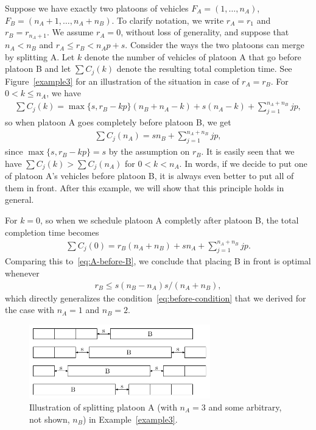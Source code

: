 \documentclass{article}
\theoremstyle{definition}
\theoremstyle{plain}
\begin{document}
\begin{eg}
  \label{example3}
  Suppose we have exactly two platoons of vehicles $F_{A} = (1, \dots, n_{A})$,
  $F_{B} = (n_{A} + 1, \dots, n_{A} + n_{B})$. To clarify notation, we write
  $r_{A} = r_{1}$ and $r_{B} = r_{n_{A} + 1}$. We assume $r_{A} = 0$, without
  loss of generality, and suppose that $n_{A} < n_{B}$ and
  $r_{A} \leq r_{B} < n_{A}p + s$. Consider the ways the two platoons can merge
  by splitting A. Let $k$ denote the number of vehicles of platoon A that go
  before platoon B and let $\sum C_{j}(k)$ denote the resulting total completion
  time. See Figure~\ref{example3} for an illustration of the situation in case of
  $r_{A} = r_{B}$. For $0 < k \leq n_{A}$, we have
  \begin{align*}
    \sum C_{j} (k) = \max\{ s, r_{B} - kp\} (n_{B} + n_{A} - k) + s (n_{A} - k) + \sum_{j=1}^{n_{A}+n_{B}} jp ,
  \end{align*}
  so when platoon A goes completely before platoon B, we get
  \begin{align}
    \sum C_{j} (n_{A}) = s n_{B} + \sum_{j=1}^{n_{A}+n_{B}} jp ,
    \label{eq:A-before-B}
  \end{align}
  since $\max\{ s, r_{B} - kp \} = s$ by the assumption on $r_{B}$. It is easily
  seen that we have $\sum C_{j}(k) > \sum C_{j} (n_{A})$ for $0 < k < n_{A}$. In
  words, if we decide to put one of platoon A's vehicles before platoon B, it is
  always even better to put all of them in front. After this example, we will
  show that this principle holds in general.

  For $k=0$, so when we schedule platoon A completly after platoon B, the total
  completion time becomes
  \begin{align*}
    \sum C_{j} (0) = r_{B} (n_{A} + n_{B}) + s n_{A} + \sum_{j=1}^{n_{A}+n_{B}} jp .
  \end{align*}
  Comparing this to~\eqref{eq:A-before-B}, we conclude that placing B in front
  is optimal whenever
  \begin{align*}
    r_{B} \leq s (n_{B} - n_{A}) s / (n_{A} + n_{B}) ,
  \end{align*}
  which directly generalizes the condition~\eqref{eq:before-condition} that we
  derived for the case with $n_{A} = 1$ and $n_{B} = 2$.
\end{eg}

\begin{figure}
  \centering
  \includegraphics[width=0.70\textwidth]{figures/platoons.pdf}
  \caption{Illustration of splitting platoon A (with $n_{A}=3$ and some arbitrary, not shown, $n_{B}$) in Example~\ref{example3}.}
  \label{fig:example3}
\end{figure}
\end{document}
